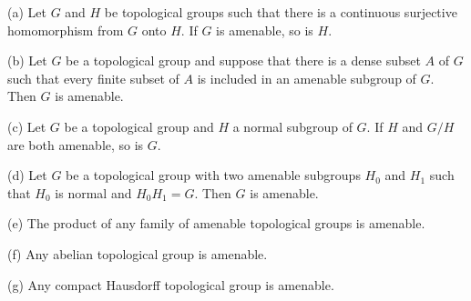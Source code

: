  (a) Let $G$ and $H$ be topological groups such
that there is a continuous surjective homomorphism from $G$ onto $H$.
If $G$ is amenable, so is $H$.

(b) Let $G$ be a topological group and suppose that there is a dense
subset $A$ of $G$ such that every finite subset of $A$ is included in
an amenable subgroup of $G$.    Then $G$ is amenable.

(c) Let $G$ be a topological group and $H$ a normal subgroup of $G$.
If $H$ and $G/H$ are both amenable, so is $G$.

(d) Let $G$ be a topological group with two amenable subgroups $H_0$
and
$H_1$ such that $H_0$ is normal and $H_0H_1=G$.   Then $G$ is
amenable.

(e) The product of any family of amenable topological groups is
amenable.

(f) Any abelian topological group is amenable.

(g) Any compact Hausdorff topological group is amenable.

